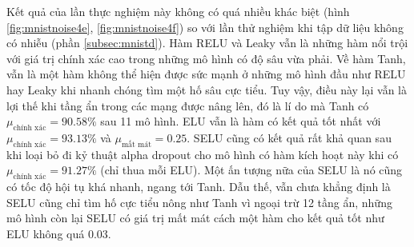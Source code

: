 Kết quả của lần thực nghiệm này không có quá nhiều khác biệt (hình \ref{fig:mnistnoise4e}, \ref{fig:mnistnoise4f}) so với lần thử nghiệm khi tập dữ liệu không có nhiễu (phần \ref{subsec:mnistd}).
Hàm RELU và Leaky vẫn là những hàm nổi trội với giá trị chính xác cao trong những mô hình có độ sâu vừa phải.
Về hàm Tanh, vẫn là một hàm không thể hiện được sức mạnh ở những mô hình đầu như RELU hay Leaky khi nhanh chóng tìm một hố sâu cực tiểu.
Tuy vậy, điều này lại vẫn là lợi thế khi tầng ẩn trong các mạng được nâng lên, đó là lí do mà Tanh có $\mu_{\text{chính xác}} = 90.58\%$ sau 11 mô hình.
ELU vẫn là hàm có kết quả tốt nhất với $\mu_{\text{chính xác}} = 93.13\%$ và $\mu_{\text{mất mát}} = 0.25$.
SELU cũng có kết quả rất khả quan sau khi loại bỏ đi kỷ thuật alpha dropout cho mô hình có hàm kích hoạt này khi có $\mu_{\text{chính xác}} = 91.27\%$ (chỉ thua mỗi ELU).
Một ấn tượng nữa của SELU là nó cũng có tốc độ hội tụ khá nhanh, ngang tới Tanh.
Dẫu thế, vẫn chưa khẳng định là SELU cũng chỉ tìm hố cực tiểu nông như Tanh vì ngoại trừ 12 tầng ẩn, những mô hình còn lại SELU có giá trị mất mát cách một hàm cho kết quả tốt như ELU không quá 0.03.

